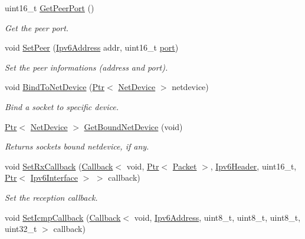 \begin{DoxyCompactItemize}
uint16\+\_\+t \hyperlink{classns3_1_1Ipv6EndPoint_ac200f6b424104280ec1e55a415ed96fd}{Get\+Peer\+Port} ()
\begin{DoxyCompactList}\small\item\em Get the peer port. \end{DoxyCompactList}\item 
void \hyperlink{classns3_1_1Ipv6EndPoint_a269971e8551e8e1e84865f274e89f9a0}{Set\+Peer} (\hyperlink{classns3_1_1Ipv6Address}{Ipv6\+Address} addr, uint16\+\_\+t \hyperlink{visualizer-ideas_8txt_a21ff1c530daf8435e00048b7fc2c58e3}{port})
\begin{DoxyCompactList}\small\item\em Set the peer informations (address and port). \end{DoxyCompactList}\item 
void \hyperlink{classns3_1_1Ipv6EndPoint_aa8bfe996727cd7064564a9fbd34cd0f5}{Bind\+To\+Net\+Device} (\hyperlink{classns3_1_1Ptr}{Ptr}$<$ \hyperlink{classns3_1_1NetDevice}{Net\+Device} $>$ netdevice)
\begin{DoxyCompactList}\small\item\em Bind a socket to specific device. \end{DoxyCompactList}\item 
\hyperlink{classns3_1_1Ptr}{Ptr}$<$ \hyperlink{classns3_1_1NetDevice}{Net\+Device} $>$ \hyperlink{classns3_1_1Ipv6EndPoint_a58a52786b0b00f8b361104d0eca50bc8}{Get\+Bound\+Net\+Device} (void)
\begin{DoxyCompactList}\small\item\em Returns socket\textquotesingle{}s bound netdevice, if any. \end{DoxyCompactList}\item 
void \hyperlink{classns3_1_1Ipv6EndPoint_adec9357acb2821c4bba0222bcc5638f1}{Set\+Rx\+Callback} (\hyperlink{classns3_1_1Callback}{Callback}$<$ void, \hyperlink{classns3_1_1Ptr}{Ptr}$<$ \hyperlink{classns3_1_1Packet}{Packet} $>$, \hyperlink{classns3_1_1Ipv6Header}{Ipv6\+Header}, uint16\+\_\+t, \hyperlink{classns3_1_1Ptr}{Ptr}$<$ \hyperlink{classns3_1_1Ipv6Interface}{Ipv6\+Interface} $>$ $>$ callback)
\begin{DoxyCompactList}\small\item\em Set the reception callback. \end{DoxyCompactList}\item 
void \hyperlink{classns3_1_1Ipv6EndPoint_a482f65430f138b5780bb063bc716c514}{Set\+Icmp\+Callback} (\hyperlink{classns3_1_1Callback}{Callback}$<$ void, \hyperlink{classns3_1_1Ipv6Address}{Ipv6\+Address}, uint8\+\_\+t, uint8\+\_\+t, uint8\+\_\+t, uint32\+\_\+t $>$ callback)

\end{DoxyCompactItemize}
